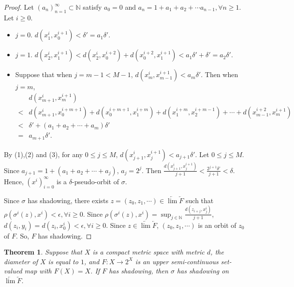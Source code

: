 \documentclass[12pt]{amsart}
\newtheorem{theorem}{Theorem}[section]
\theoremstyle{definition}
\begin{document}
\begin{proof}
	{Let $(a_n)_{n=1}^\infty\subset\mathbb{N}$ satisfy $a_0=0$ and $a_n=1+a_1+a_2+\cdots a_{n-1},\forall n\geq1$. Let $i\geq0$.
		\begin{itemize}
			\item [(1)]$j=0$. $d(x_1^i,x_0^{i+1})<\delta'=a_1\delta'$.
			\item[(2)]$j=1$. $d(x_2^i,x_1^{i+1})<d(x_2^i,x_0^{i+2})+d(x_0^{i+2},x_1^{i+1})<a_1\delta'+\delta'=a_2\delta'$.
			\item[(3)]Suppose that when $j=m-1<M-1$, $d(x^i_m,x^{i+1}_{m-1})<a_m\delta'$. Then when $j=m$,
			\begin{align}
				&d(x_{m+1}^i,x_m^{i+1}) \nonumber \\   %
				<&d(x_{m+1}^i,x_0^{i+m+1})+d(x_0^{i+m+1},x_1^{i+m})+d(x^{i+m}_1,x_2^{i+m-1})+\cdots+d(x_{m-1}^{i+2},x_m^{i+1})\nonumber\\
				<&\delta'+(a_1+a_2+\cdots+a_m)\delta'\nonumber\\
				=&a_{m+1}\delta'.\nonumber
			\end{align}
		\end{itemize} 
		By (1),(2) and (3), for any $0\leq j\leq M$, $d(x_{j+1}^i,x_j^{i+1})<a_{j+1}\delta'$. Let $0\leq j\leq M$. Since $a_{j+1}=1+(a_1+a_2+\cdots+a_j)$, $a_j=2^j$. Then $\frac{d(x_{j+1}^i,x_j^{i+1})}{j+1}<\frac{2^{j+1}\delta'}{j+1}<\delta$. Hence, $(x^i)_{i=0}^\infty$ is a $\delta$-pseudo-orbit of $\sigma$. }
	
	{Since $\sigma$ has shadowing, there exists $z=(z_0,z_1,\cdots)\in \underleftarrow{\lim} \underleftarrow{F}$ such that $\rho(\sigma^i(z),x^i)<\epsilon,\forall i\geq 0$. Since $\rho(\sigma^i(z),x^i)=\sup_{j\in\mathbb{N}}\frac{d(z_{i+j},x^i_j)}{j+1}$, $d(z_i,y_i)=d(z_i,x_0^i)<\epsilon,\forall i\geq0$. Since $z\in \underleftarrow{\lim} \underleftarrow{F}$, $(z_0,z_1,\cdots)$ is an orbit of $z_0$ of $F$. So, $F$ has shadowing.}
\end{proof}
\begin{theorem}\label{thm3}
	Suppose that $X$ is a compact metric space with metric $d$, the diameter of $X$ is equal to $1$, and $F:X\rightarrow 2^X$ is an upper semi-continuous set-valued map with $F(X)=X$. If $F$ has shadowing, then $\sigma$ has shadowing on $\underleftarrow{\lim} \underleftarrow{F}$.
\end{theorem}
\end{document}
